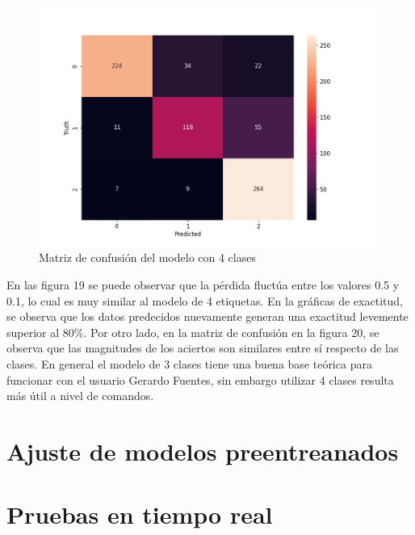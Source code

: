 \begin{figure}[H]
	\centering
	\includegraphics[scale=0.75]{figures/CM5.png}
	\caption{Matriz de confusión del modelo con 4 clases}
	\label{fig:img20}
\end{figure}

En las figura 19 se puede observar que la pérdida fluctúa entre los valores 0.5 y 0.1, lo cual es muy similar al modelo de 4 etiquetas. En la gráficas de exactitud, se observa que los datos predecidos nuevamente generan una exactitud levemente superior al 80\%. Por otro lado, en la matriz de confusión en la figura 20, se observa que las magnitudes de los aciertos son similares entre sí respecto de las clases. En general el modelo de 3 clases tiene una buena base teórica para funcionar con el usuario Gerardo Fuentes, sin embargo utilizar 4 clases resulta más útil a nivel de comandos. \par


\section{Ajuste de modelos preentreanados}

\section{Pruebas en tiempo real}

